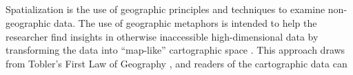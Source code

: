 \documentclass[12pt,letterpaper,notitlepage,onecolumn,final,openbib]{article}
\begin{document}
\subsection{}
Spatialization is the use of geographic principles and techniques to examine non-geographic data\cite{SkupinSpatialization2003}.  The use of geographic metaphors is intended to help the researcher find insights in otherwise inaccessible high-dimensional data by transforming the data into ``map-like'' cartographic space  \cite{SkupinFabrikant2008}.  This approach draws from Tobler's First Law of Geography \cite{toblera1970}, and readers of the cartographic data can   
\subsection{}
\subsection{}
\subsection{}
\subsection{}


	\pagebreak
	
	
\end{document}
